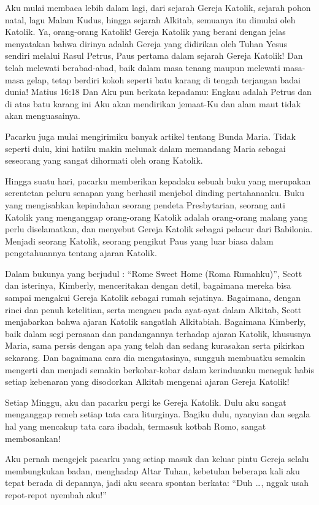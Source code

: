 Aku mulai membaca lebih dalam lagi, dari sejarah Gereja Katolik, sejarah pohon natal, lagu Malam Kudus, hingga sejarah Alkitab, semuanya itu dimulai oleh Katolik. Ya, orang-orang Katolik! Gereja Katolik yang berani dengan jelas menyatakan bahwa dirinya adalah Gereja yang didirikan oleh Tuhan Yesus sendiri melalui Rasul Petrus, Paus pertama dalam sejarah Gereja Katolik! Dan telah melewati berabad-abad, baik dalam masa tenang maupun melewati masa-masa gelap, tetap berdiri kokoh seperti batu karang di tengah terjangan badai dunia!
Matius 16:18 Dan Aku pun berkata kepadamu: Engkau adalah Petrus dan di atas batu karang ini Aku akan mendirikan jemaat-Ku dan alam maut tidak akan menguasainya.

Pacarku juga mulai mengirimiku banyak artikel tentang Bunda Maria. Tidak seperti dulu, kini hatiku makin melunak dalam memandang Maria sebagai seseorang yang sangat dihormati oleh orang Katolik.

Hingga suatu hari, pacarku memberikan kepadaku sebuah buku yang merupakan serentetan peluru senapan yang berhasil menjebol dinding pertahananku. Buku yang mengisahkan kepindahan seorang pendeta Presbytarian, seorang anti Katolik yang menganggap orang-orang Katolik adalah orang-orang malang yang perlu diselamatkan, dan menyebut Gereja Katolik sebagai pelacur dari Babilonia. Menjadi seorang Katolik, seorang pengikut Paus yang luar biasa dalam pengetahuannya tentang ajaran Katolik.

Dalam bukunya yang berjudul : “Rome Sweet Home (Roma Rumahku)”, Scott dan isterinya, Kimberly, menceritakan dengan detil, bagaimana mereka bisa sampai mengakui Gereja Katolik sebagai rumah sejatinya. Bagaimana, dengan rinci dan penuh ketelitian, serta mengacu pada ayat-ayat dalam Alkitab, Scott menjabarkan bahwa ajaran Katolik sangatlah Alkitabiah. Bagaimana Kimberly, baik dalam segi perasaan dan pandangannya terhadap ajaran Katolik, khususnya Maria, sama persis dengan apa yang telah dan sedang kurasakan serta pikirkan sekarang. Dan bagaimana cara dia mengatasinya, sungguh membuatku semakin mengerti dan menjadi semakin berkobar-kobar dalam kerinduanku meneguk habis setiap kebenaran yang disodorkan Alkitab mengenai ajaran Gereja Katolik!

Setiap Minggu, aku dan pacarku pergi ke Gereja Katolik. Dulu aku sangat menganggap remeh setiap tata cara liturginya. Bagiku dulu, nyanyian dan segala hal yang mencakup tata cara ibadah, termasuk kotbah Romo, sangat membosankan!

Aku pernah mengejek pacarku yang setiap masuk dan keluar pintu Gereja selalu membungkukan badan, menghadap Altar Tuhan, kebetulan beberapa kali aku tepat berada di depannya, jadi aku secara spontan berkata: “Duh \ldots , nggak usah repot-repot nyembah aku!”


